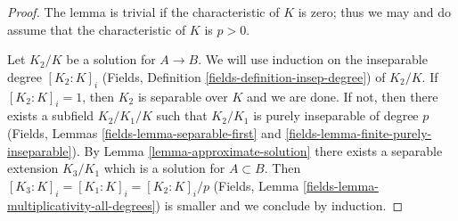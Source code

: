 \documentclass[10pt,a4paper]{amsart}
\theoremstyle{plain}
\theoremstyle{definition}
\theoremstyle{remark}
\numberwithin{equation}{subsection}
\begin{document}
\begin{proof}
The lemma is trivial if the characteristic of $K$ is zero; thus we may
and do assume that the characteristic of $K$ is $p > 0$.

\medskip\noindent
Let $K_2/K$ be a solution for $A \to B$. We will use induction on the
inseparable degree $[K_2 : K]_i$
(Fields, Definition \ref{fields-definition-insep-degree}) of $K_2/K$.
If $[K_2 : K]_i = 1$, then $K_2$ is separable over $K$ and we are done.
If not, then there exists a subfield $K_2/K_1/K$ such that $K_2/K_1$
is purely inseparable of degree $p$
(Fields, Lemmas \ref{fields-lemma-separable-first} and
\ref{fields-lemma-finite-purely-inseparable}). By
Lemma \ref{lemma-approximate-solution}
there exists a separable extension $K_3/K_1$ which is a
solution for $A \subset B$. Then
$[K_3 : K]_i = [K_1 : K]_i = [K_2 : K]_i/p$
(Fields, Lemma \ref{fields-lemma-multiplicativity-all-degrees})
is smaller and we conclude by induction.
\end{proof}
\end{document}
